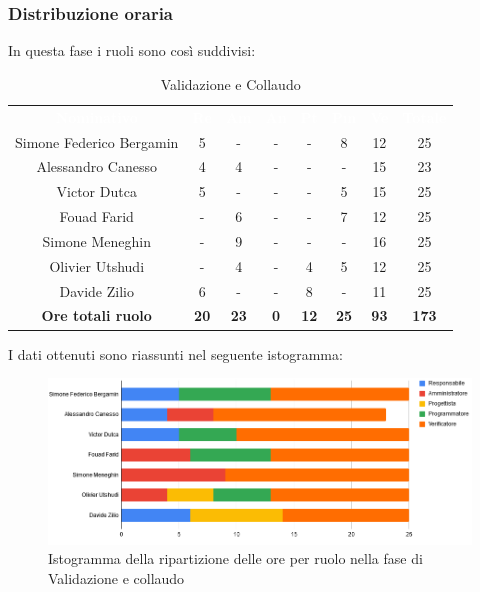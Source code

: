 \subsubsection{Distribuzione oraria}
In questa fase i ruoli sono così suddivisi:

\begin{table}[H]
\centering\renewcommand{\arraystretch}{1.5}
\caption{Validazione e Collaudo}
\vspace{0.2cm}
\begin{tabular}{ c c c c c c c c }
\rowcolor{redafk}
\textcolor{white}{\textbf{Nominativo}} & \textcolor{white}{\textbf{Re}} & 
\textcolor{white}{\textbf{Am}} & \textcolor{white}{\textbf{An}} &
\textcolor{white}{\textbf{Pt}} & \textcolor{white}{\textbf{Pm}} &
\textcolor{white}{\textbf{Ve}} & \textcolor{white}{\textbf{Totale}} \\
Simone Federico Bergamin 	& 5 	& - 	& - 	& - 	& 8 	& 12 	& 25 \\
Alessandro Canesso 			& 4 	& 4 	& - 	& - 	& - 	& 15 	& 23 \\
Victor Dutca 				& 5 	& - 	& - 	& - 	& 5 	& 15 	& 25 \\
Fouad Farid					& - 	& 6 	& - 	& - 	& 7 	& 12 	& 25 \\
Simone Meneghin 			& - 	& 9 	& - 	& - 	& - 	& 16 	& 25 \\
Olivier Utshudi 			& - 	& 4 	& - 	& 4 	& 5 	& 12 	& 25 \\
Davide Zilio 				& 6 	& - 	& - 	& 8 	& - 	& 11 	& 25 \\
\rowcolor{lastrowcolor}
\textbf{Ore totali ruolo} & \textbf{20} & \textbf{23} & \textbf{0} & \textbf{12} & \textbf{25} & \textbf{93} & \textbf{173} \\
\end{tabular}
\end{table}

I dati ottenuti sono riassunti nel seguente istogramma: 
\begin{figure}[H]
\centering
\includegraphics[scale=0.60]{img/grafici/tabella_fase_val_col.png}
\caption{Istogramma della ripartizione delle ore per ruolo nella fase di Validazione e collaudo}
\end{figure}

